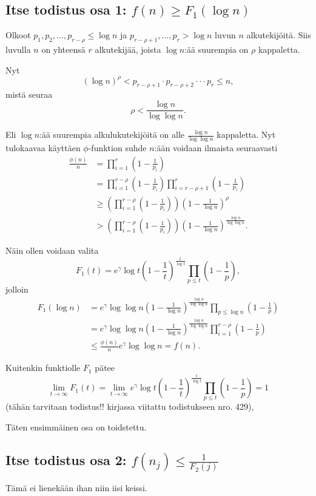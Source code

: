 \documentclass{article}
\begin{document}
\subsection{Itse todistus osa 1: $f(n) \geq F_1(\log n)$}

Olkoot $p_1,p_2,...,p_{r-\rho} \leq \log n$ ja $p_{r-\rho+1},...,p_r > \log n$ luvun $n$ alkutekijöitä. Siis luvulla $n$ on yhteensä $r$ alkutekijää, joista $\log n$:ää suurempia on $\rho$ kappaletta.

Nyt
\begin{equation}
    (\log n)^\rho < p_{r-\rho+1} \cdot p_{r-\rho+2} \cdot \cdot \cdot p_r \leq n,
\end{equation}
mistä seuraa
\begin{equation}
    \rho < \frac{\log n}{\log\log n}.
\end{equation}

Eli $\log n$:ää suurempia alkulukutekijöitä on alle $\frac{\log n}{\log\log n}$ kappaletta.
Nyt tulokaavaa käyttäen $\phi$-funktion suhde $n$:ään voidaan ilmaista seuraavasti
\begin{align}
    \frac{\phi(n)}{n} & = \prod_{i=1}^r(1-\frac{1}{p_i})\\
    & = \prod_{i=1}^{r-\rho}(1-\frac{1}{p_i}) \prod_{i=r-\rho+1}^r(1-\frac{1}{p_i})\\
    & \geq \left(\prod_{i=1}^{r-\rho}(1-\frac{1}{p_i})\right) (1-\frac{1}{\log n})^\rho\\
    & > \left(\prod_{i=1}^{r-\rho}(1-\frac{1}{p_i})\right) (1-\frac{1}{\log n})^\frac{\log n}{\log \log n}.
\end{align}

Näin ollen voidaan valita
\begin{equation*}
    F_1(t)=e^\gamma \log t \left(1-\frac{1}{t}\right)^\frac{t}{\log t} \prod_{p\leq t} \left(1-\frac{1}{p}\right),
\end{equation*}
jolloin
\begin{align*}
    F_1(\log n) & = e^\gamma \log \log n \left(1-\frac{1}{\log n}\right)^\frac{\log n}{\log \log n} \prod_{p\leq \log n} \left(1-\frac{1}{p}\right)\\
    & = e^\gamma \log \log n \left(1-\frac{1}{\log n}\right)^\frac{\log n}{\log \log n} \prod_{i=1}^{r-\rho} \left(1-\frac{1}{p}\right)\\
    & \leq \frac{\phi(n)}{n} e^\gamma \log\log n = f(n).
\end{align*}

Kuitenkin funktiolle $F_1$ pätee
\begin{equation*}
    \lim_{t \rightarrow \infty} F_1(t) = \lim_{t \rightarrow \infty} e^\gamma \log t \left(1-\frac{1}{t}\right)^\frac{t}{\log t} \prod_{p\leq t} \left(1-\frac{1}{p}\right) = 1
\end{equation*}
(tähän tarvitaan todistus!! kirjassa viitattu todistukseen nro. 429),

Täten ensimmäinen osa on toidstettu.

\subsection{Itse todistus osa 2: $f(n_j) \leq \frac{1}{F_2(j)}$}

Tämä ei lienekään ihan niin iisi keissi.
\end{document}
